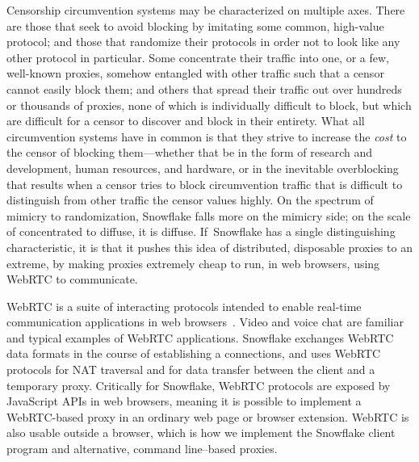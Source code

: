 \documentclass[letterpaper,twocolumn]{article}
\begin{document}
Censorship circumvention systems
may be characterized on multiple axes.
There are those that seek to avoid blocking
by imitating some common, high-value protocol;
and those that randomize their protocols
in order not to look like any other protocol in particular.
Some concentrate their traffic into one, or a few,
well-known proxies, somehow entangled with other traffic
such that a censor cannot easily block them;
and others that spread their traffic out over
hundreds or thousands of proxies,
none of which is individually difficult to block,
but which are difficult for a censor to discover and block in their entirety.
What all circumvention systems have in common
is that they strive to increase the \emph{cost}
to the censor of blocking them---whether that be
in the form of research and development,
human resources, and hardware,
or in the inevitable overblocking that results
when a censor tries to block circumvention traffic
that is difficult to distinguish from other traffic
the censor values highly.
On the spectrum of mimicry to randomization,
Snowflake falls more on the mimicry side;
on the scale of concentrated to diffuse,
it is diffuse.
If~Snowflake has a single distinguishing characteristic,
it is that it pushes this idea of distributed, disposable
proxies to an extreme,
by making proxies extremely cheap to run,
in web browsers, using WebRTC to communicate.

WebRTC is a suite of interacting protocols
intended to enable real-time communication applications
in web browsers~\cite{rfc8825}.
Video and voice chat are familiar and typical examples
of WebRTC applications.
Snowflake exchanges WebRTC data formats
in the course of establishing a connections,
and uses WebRTC protocols for NAT traversal
and for data transfer between the client and a temporary proxy.
Critically for Snowflake, WebRTC protocols
are exposed by JavaScript APIs in web browsers,
meaning it is possible to implement a WebRTC-based proxy
in an ordinary web page or browser extension.
WebRTC is also usable outside a browser,
which is how we implement the Snowflake client program
and alternative, command line--based proxies.
\end{document}
